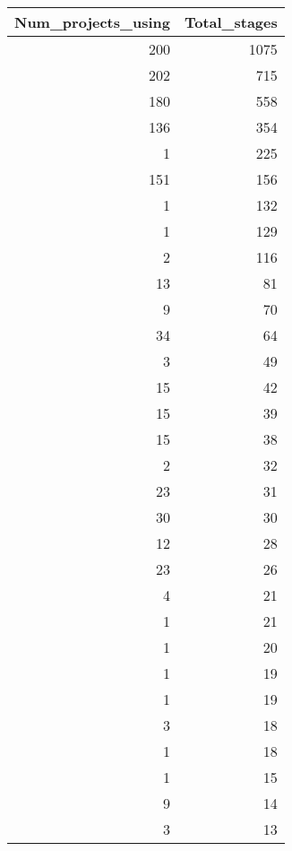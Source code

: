 \begin{tabular}{rr}
\toprule
 Num\_projects\_using &  Total\_stages \\
\midrule
                200 &          1075 \\
                202 &           715 \\
                180 &           558 \\
                136 &           354 \\
                  1 &           225 \\
                151 &           156 \\
                  1 &           132 \\
                  1 &           129 \\
                  2 &           116 \\
                 13 &            81 \\
                  9 &            70 \\
                 34 &            64 \\
                  3 &            49 \\
                 15 &            42 \\
                 15 &            39 \\
                 15 &            38 \\
                  2 &            32 \\
                 23 &            31 \\
                 30 &            30 \\
                 12 &            28 \\
                 23 &            26 \\
                  4 &            21 \\
                  1 &            21 \\
                  1 &            20 \\
                  1 &            19 \\
                  1 &            19 \\
                  3 &            18 \\
                  1 &            18 \\
                  1 &            15 \\
                  9 &            14 \\
                  3 &            13 \\

\end{tabular}

